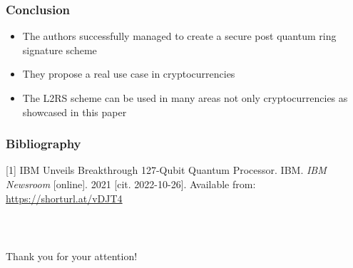 \documentclass[%
  14pt,       				%
	c,                  %
	aspectratio=1610,   %
	unicode,						%
]{beamer}				    	%
\begin{document}
\begin{frame}
  \frametitle{Conclusion}
  \large{
    \begin{itemize}
      \item The authors successfully managed to create a secure post quantum ring signature scheme
      \item They propose a real use case in cryptocurrencies
      \item The L2RS scheme can be used in many areas not only cryptocurrencies as showcased in this paper
    \end{itemize}
  }
\end{frame}

\begin{frame}
  \frametitle{Bibliography}
  \small{
    [1] IBM Unveils Breakthrough 127-Qubit Quantum Processor. IBM. \textit{IBM Newsroom} [online]. 2021 [cit. 2022-10-26]. Available from: \url{https://shorturl.at/vDJT4}
  }
\end{frame}

\begin{frame}[c]
  \frametitle{\mbox{ }}
  \begin{center}
    {\Huge Thank you for your attention!}
  \end{center}
\end{frame}
\end{document}

